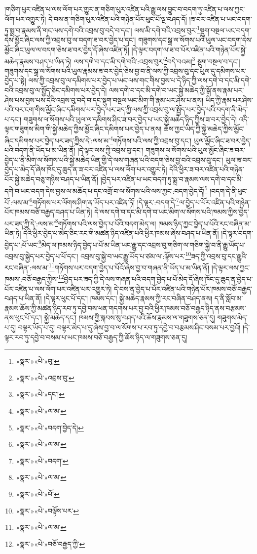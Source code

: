 །གཅིག་པུར་འཛིན་པ་ལས་ལོག་པར་གྱུར་ན་གཅིག་པུར་འཛིན་པའི་རྒྱུ་ལས་བྱུང་བ་བདག་ཏུ་འཛིན་པ་ལས་ཀྱང་ལོག་པར་འགྱུར་ཏེ། དེ་བས་ན་གཅིག་པུར་འཛིན་པའི་གཉེན་པོར་ཕུང་པོ་ལྔ་བཤད་དོ། །ཟ་བར་འཛིན་པ་ཡང་བདག་ཏུ་སྨྲ་བ་རྣམས་ནི་གང་ལས་དགེ་བའི་འབྲས་བུ་བདེ་བ་དང་། ལས་མི་དགེ་བའི་འབྲས་བུར་\footnote{«སྣར་»«པེ་»བུ་}སྡུག་བསྔལ་ཡང་བདག་དེས་མྱོང་ཞིང་ལས་ཀྱི་འབྲས་བུ་ལ་བདག་ཟ་བར་བྱེད་པ་དང་། གཟུགས་དང་སྒྲ་ལ་སོགས་པའི་ཡུལ་ཡང་བདག་དེས་མྱོང་ཞིང་ཡུལ་ལ་བདག་ཅེས་ཟ་བར་བྱེད་དོ་ཞེས་འཛིན་ཏོ། །དེ་ལྟར་བདག་ལ་ཟ་བ་པོར་འཛིན་པའི་གཉེན་པོར་སྐྱེ་མཆེད་རྣམས་བཤད་པ་ཡིན་ཏེ། ལས་དགེ་བ་དང་མི་དགེ་བའི་:འབྲས་བུར་\footnote{«སྣར་»«པེ་»འབྲས་བུ་}བདེ་བའམ།\footnote{«སྣར་»«པེ་»དང་།} སྡུག་བསྔལ་བ་དང་། གཟུགས་དང་སྒྲ་ལ་སོགས་པའི་ཡུལ་རྣམས་ཟ་བར་བྱེད་ཅེས་བྱ་བ་ནི་ལས་ཀྱི་འབྲས་བུ་དང་ཡུལ་དུ་དམིགས་པར་བྱེད་པ་སྟེ། ལས་ཀྱི་འབྲས་བུ་ལ་དམིགས་པར་བྱེད་པ་ཡང་ལས་གང་གིས་བྱས་པ་དེ་ཉིད་ཀྱི་ལས་དགེ་བ་དང་མི་དགེ་བའི་འབྲས་བུ་ལ་སྤྱོད་ཅིང་དམིགས་པར་བྱེད་དེ། ལས་དགེ་བ་དང་མི་དགེ་བ་ཡང་སྐྱེ་མཆེད་ཀྱི་སྒོ་ནས་རྣམ་པར་ཤེས་པས་བྱས་པས་དེའི་འབྲས་བུ་བདེ་བ་དང་སྡུག་བསྔལ་ཡང་མིག་གི་རྣམ་པར་ཤེས་པ་ནས། ཡིད་ཀྱི་རྣམ་པར་ཤེས་པའི་བར་ངག་གིས་མྱོང་ཞིང་དམིགས་པར་བྱེད་པར་ཟད་ཀྱི་ལས་ཀྱི་འབྲས་བུ་ལ་སྤྱོད་པར་བྱེད་པའི་བདག་ནི་མེད་པ་དང་། གཟུགས་ལ་སོགས་པའི་ཡུལ་ལ་དམིགས་ཤིང་ཟ་བར་བྱེད་པ་ཡང་སྐྱེ་མཆེད་ཉིད་ཀྱིས་ཟ་བར་བྱེད་དེ། འདི་ལྟར་གཟུགས་མིག་གི་སྐྱེ་མཆེད་ཀྱིས་མྱོང་ཞིང་དམིགས་པར་བྱེད་པ་ནས། ཆོས་ཀྱང་ཡིད་ཀྱི་སྐྱེ་མཆེད་ཀྱིས་མྱོང་ཞིང་དམིགས་པར་བྱེད་པར་ཟད་ཀྱིས་དེ་:ལས་མ་\footnote{«སྣར་»«པེ་»ལ་མ་}གཏོགས་པའི་ལས་ཀྱི་འབྲས་བུ་དང་། ཡུལ་མྱོང་ཞིང་ཟ་བར་བྱེད་པའི་བདག་ནི་ཡོད་པ་མ་ཡིན་ནོ། །དེ་ལྟར་ལས་ཀྱི་འབྲས་བུ་དང་། གཟུགས་ལ་སོགས་པའི་ཡུལ་མྱོང་ཞིང་ཟ་བར་བྱེད་པ་ནི་མིག་ལ་སོགས་པའི་སྐྱེ་མཆེད་ཡིན་གྱི་དེ་ལས་གཞན་པའི་བདག་ཅེས་བྱ་བའི་འབྲས་བུ་དང་། ཡུལ་ཟ་བར་བྱེད་པ་མེད་དོ་ཞེས་ཁོང་དུ་ཆུད་ན་ཟ་བར་འཛིན་པ་ལས་ལོག་པར་འགྱུར་ཏེ། དེའི་ཕྱིར་ཟ་བར་འཛིན་པའི་གཉེན་པོར་སྐྱེ་མཆེད་བཅུ་གཉིས་བཤད་པ་ཡིན་ནོ། །བྱེད་པར་འཛིན་པ་ཡང་བདག་ཏུ་སྨྲ་བ་རྣམས་ལས་དགེ་བ་དང་མི་དགེ་བ་ཡང་བདག་དེས་བྱས་ལ་མཆོད་པ་དང་འགྲོ་བ་ལ་སོགས་པའི་ལས་ཀྱང་:བདག་བྱེད་དོ།\footnote{«སྣར་»«པེ་»བདག་བྱེད་དེ།} །བདག་དེ་ནི་ཕུང་པོ་:ལས་མ་\footnote{«སྣར་»«པེ་»ལ་མ་}གཏོགས་པར་ལོགས་ཤིག་ན་ཡོད་པར་འཛིན་ཏོ། །དེ་ལྟར་:བདག་དེ་\footnote{«སྣར་»«པེ་»བདག་}ལ་བྱེད་པ་པོར་འཛིན་པའི་གཉེན་པོར་ཁམས་བཅོ་བརྒྱད་བཤད་པ་ཡིན་ཏེ། དེ་ལས་དགེ་བ་དང་མི་དགེ་བ་ཡང་མིག་ལ་སོགས་པའི་ཁམས་ཀྱིས་བྱེད་པར་ཟད་ཀྱི་དེ་:ལས་མ་\footnote{«སྣར་»«པེ་»ལ་མ་}གཏོགས་པའི་ལས་བྱེད་པ་པོའི་བདག་མེད་ལ། ཁམས་ཉིད་ཀྱང་བྱེད་པ་པོའི་རང་བཞིན་མ་ཡིན་ཏེ། དེའི་ཕྱིར་བྱེད་པ་མེད་ཅིང་རང་གི་མཚན་ཉིད་འཛིན་པའི་ཕྱིར་ཁམས་ཞེས་བཤད་པ་ཡིན་ནོ། །དེ་ལྟར་བདག་བྱེད་པ་:པོ་ཡང་\footnote{«སྣར་»«པེ་»པོ་}མེད་ལ་ཁམས་ཉིད་བྱེད་པ་པོ་མ་ཡིན་ཡང་རྒྱུ་དང་འབྲས་བུ་གཅིག་ལ་གཅིག་སྐྱེ་བ་ནི་རྒྱུ་ཡོད་པ་འབྲས་བུ་སྐྱེད་པར་བྱེད་པ་པོ་དང་། འབྲས་བུ་སྐྱེ་བ་ཡང་རྒྱུ་ཡོད་པ་ཙམ་ལ་:ལྟོས་པར་\footnote{«སྣར་»«པེ་»བལྟོས་པར་}ཟད་ཀྱི་འབྲས་བུ་དང་རྒྱུའི་རང་བཞིན་:ལས་མ་\footnote{«སྣར་»«པེ་»ལ་མ་}གཏོགས་པར་བདག་བྱེད་པ་པོའོ་ཞེས་བྱ་བ་གཞན་ནི་ཡོད་པ་མ་ཡིན་ནོ། །དེ་ལྟར་ལས་ཀྱང་ཁམས་:བཅོ་བརྒྱད་ཀྱིས་\footnote{«སྣར་»«པེ་»བཅོ་བརྒྱད་ཀྱི་}བྱེད་པར་ཟད་ཀྱི་དེ་ལས་གཞན་པའི་བདག་བྱེད་པ་པོ་མེད་དོ་ཞེས་ཁོང་དུ་ཆུད་ན་བྱེད་པ་པོར་འཛིན་པ་ལས་ལོག་པར་འཛིན་པར་འགྱུར་ཏེ། དེ་བས་ན་བྱེད་པ་པོར་འཛིན་པའི་གཉེན་པོར་ཁམས་བཅོ་བརྒྱད་བཤད་པ་ཡིན་ནོ། །དེ་ལྟར་ཕུང་པོ་དང་། ཁམས་དང་། སྐྱེ་མཆེད་རྣམས་ཀྱི་རང་བཞིན་བཤད་ནས། ད་ནི་སློབ་མ་རྣམས་ཆོས་ཀྱི་མཚན་ཉིད་རབ་ཏུ་དབྱེ་བས་ཕན་གདགས་པར་བྱ་བའི་ཕྱིར་ཁམས་བཅོ་བརྒྱད་ཉིད་ནས་བརྩམས་ནས་ཕུང་པོ་དང་། སྐྱེ་མཆེད་དང་། ཁམས་ཀྱི་སྐབས་སུ་བཤད་པའི་ཆོས་རྣམས་ལ་གཟུགས་ཅན་དུ། གཟུགས་མེད་པ་དུ། བལྟར་ཡོད་པ་དུ། བལྟར་མེད་པ་དུ་ཞེས་བྱ་བ་ལ་སོགས་པ་རབ་ཏུ་དབྱེ་བ་བརྩམས་ཤིང་བསམ་པར་བྱའོ། །དེ་ལྟར་རབ་ཏུ་དབྱེ་བ་བསམ་པ་ཡང་ཁམས་བཅོ་བརྒྱད་ཀྱི་ཆོས་ཉིད་ལ་གཟུགས་ཅན་དུ། 